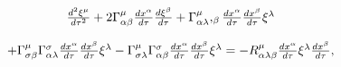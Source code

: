 \begin{equation}
\begin{array}{c}
\frac{d^{2}\xi ^{\mu }}{d\tau ^{2}}+2\Gamma _{\alpha \beta }^{\mu }\frac{%
dx^{\alpha }}{d\tau }\frac{d\xi ^{\beta }}{d\tau }+\Gamma _{\alpha \lambda
}^{\mu },_{\beta }\frac{dx^{\alpha }}{d\tau }\frac{dx^{\beta }}{d\tau }\xi
^{\lambda } \\ 
\\ 
+\Gamma _{\sigma \beta }^{\mu }\Gamma _{\alpha \lambda }^{\sigma }\frac{%
dx^{\alpha }}{d\tau }\frac{dx^{\beta }}{d\tau }\xi ^{\lambda }-\Gamma
_{\sigma \lambda }^{\mu }\Gamma _{\alpha \beta }^{\sigma }\frac{dx^{\alpha }%
}{d\tau }\frac{dx^{\beta }}{d\tau }\xi ^{\lambda }=-R_{\alpha \lambda \beta
}^{\mu }\frac{dx^{\alpha }}{d\tau }\xi ^{\lambda }\frac{dx^{\beta }}{d\tau },
\end{array}
\label{10}
\end{equation}

